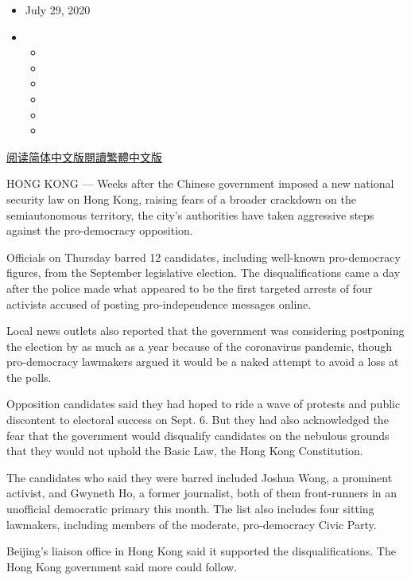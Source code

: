 \begin{itemize}
\item
  July 29, 2020
\item
  \begin{itemize}
  \item
  \item
  \item
  \item
  \item
  \item
  \end{itemize}
\end{itemize}

\href{https://cn.nytimes3xbfgragh.onion/china/20200730/hong-kong-arrests-security-law/}{阅读简体中文版}\href{https://cn.nytimes3xbfgragh.onion/china/20200730/hong-kong-arrests-security-law/zh-hant/}{閱讀繁體中文版}

HONG KONG --- Weeks after the Chinese government imposed a new national
security law on Hong Kong, raising fears of a broader crackdown on the
semiautonomous territory, the city's authorities have taken aggressive
steps against the pro-democracy opposition.

Officials on Thursday barred 12 candidates, including well-known
pro-democracy figures, from the September legislative election. The
disqualifications came a day after the police made what appeared to be
the first targeted arrests of four activists accused of posting
pro-independence messages online.

Local news outlets also reported that the government was considering
postponing the election by as much as a year because of the coronavirus
pandemic, though pro-democracy lawmakers argued it would be a naked
attempt to avoid a loss at the polls.

Opposition candidates said they had hoped to ride a wave of protests and
public discontent to electoral success on Sept. 6. But they had also
acknowledged the fear that the government would disqualify candidates on
the nebulous grounds that they would not uphold the Basic Law, the Hong
Kong Constitution.

The candidates who said they were barred included Joshua Wong, a
prominent activist, and Gwyneth Ho, a former journalist, both of them
front-runners in an unofficial democratic primary this month. The list
also includes four sitting lawmakers, including members of the moderate,
pro-democracy Civic Party.

Beijing's liaison office in Hong Kong said it supported the
disqualifications. The Hong Kong government said more could follow.

